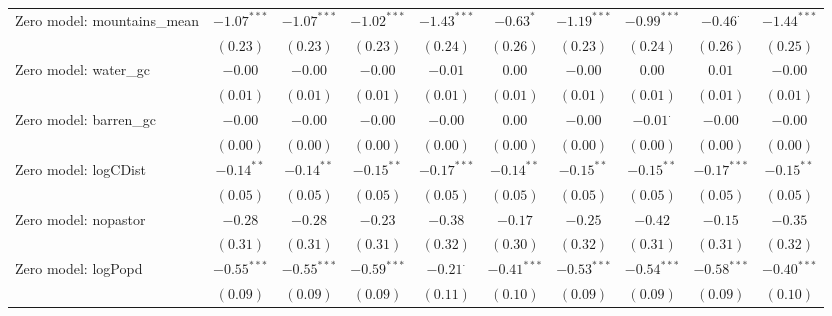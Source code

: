 \begin{table}
\begin{center}
{\begin{tabular}{l c c c c c c c c c}
Zero model: mountains\_mean    & $-1.07^{***}$  & $-1.07^{***}$  & $-1.02^{***}$  & $-1.43^{***}$   & $-0.63^{*}$    & $-1.19^{***}$   & $-0.99^{***}$   & $-0.46^{\cdot}$ & $-1.44^{***}$  \\
                               & $(0.23)$       & $(0.23)$       & $(0.23)$       & $(0.24)$        & $(0.26)$       & $(0.23)$        & $(0.24)$        & $(0.26)$        & $(0.25)$       \\
Zero model: water\_gc          & $-0.00$        & $-0.00$        & $-0.00$        & $-0.01$         & $0.00$         & $-0.00$         & $0.00$          & $0.01$          & $-0.00$        \\
                               & $(0.01)$       & $(0.01)$       & $(0.01)$       & $(0.01)$        & $(0.01)$       & $(0.01)$        & $(0.01)$        & $(0.01)$        & $(0.01)$       \\
Zero model: barren\_gc         & $-0.00$        & $-0.00$        & $-0.00$        & $-0.00$         & $0.00$         & $-0.00$         & $-0.01^{\cdot}$ & $-0.00$         & $-0.00$        \\
                               & $(0.00)$       & $(0.00)$       & $(0.00)$       & $(0.00)$        & $(0.00)$       & $(0.00)$        & $(0.00)$        & $(0.00)$        & $(0.00)$       \\
Zero model: logCDist           & $-0.14^{**}$   & $-0.14^{**}$   & $-0.15^{**}$   & $-0.17^{***}$   & $-0.14^{**}$   & $-0.15^{**}$    & $-0.15^{**}$    & $-0.17^{***}$   & $-0.15^{**}$   \\
                               & $(0.05)$       & $(0.05)$       & $(0.05)$       & $(0.05)$        & $(0.05)$       & $(0.05)$        & $(0.05)$        & $(0.05)$        & $(0.05)$       \\
Zero model: nopastor           & $-0.28$        & $-0.28$        & $-0.23$        & $-0.38$         & $-0.17$        & $-0.25$         & $-0.42$         & $-0.15$         & $-0.35$        \\
                               & $(0.31)$       & $(0.31)$       & $(0.31)$       & $(0.32)$        & $(0.30)$       & $(0.32)$        & $(0.31)$        & $(0.31)$        & $(0.32)$       \\
Zero model: logPopd            & $-0.55^{***}$  & $-0.55^{***}$  & $-0.59^{***}$  & $-0.21^{\cdot}$ & $-0.41^{***}$  & $-0.53^{***}$   & $-0.54^{***}$   & $-0.58^{***}$   & $-0.40^{***}$  \\
                               & $(0.09)$       & $(0.09)$       & $(0.09)$       & $(0.11)$        & $(0.10)$       & $(0.09)$        & $(0.09)$        & $(0.09)$        & $(0.10)$       \\

\end{tabular}}
\end{center}
\end{table}
